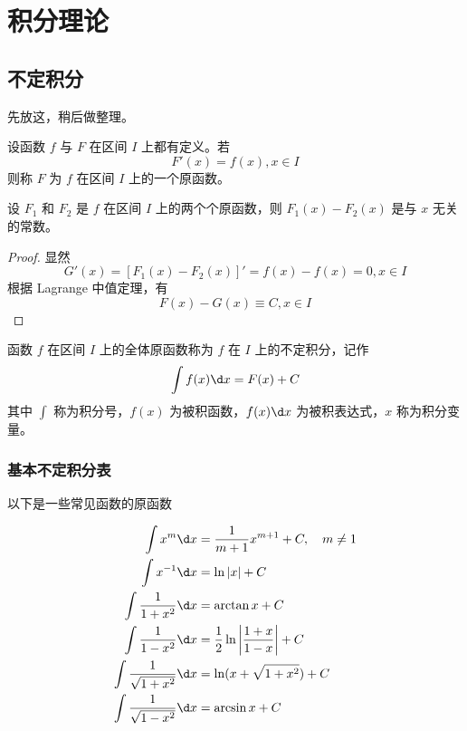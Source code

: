 \chapter{积分理论}

\section{不定积分}

先放这，稍后做整理。

\begin{definition}
	设函数 $f$ 与 $F$ 在区间 $I$ 上都有定义。若
	\[ F'(x) = f(x), x\in I \]
	则称 $F$ 为 $f$ 在区间 $I$ 上的一个原函数。
\end{definition}

\begin{theorem}
	设 $F_1$ 和 $F_2$ 是 $f$ 在区间 $I$ 上的两个个原函数，则 $F_1(x) - F_2(x)$ 是与 $x$ 无关的常数。
\end{theorem}
\begin{proof}
	显然
	\[ G'(x) = \left[ F_1(x)-F_2(x) \right]' = f(x) - f(x) = 0, x \in I \]
	根据 Lagrange 中值定理，有
	\[ F(x) - G(x) \equiv C, x\in I \]
\end{proof}

\begin{definition}
	函数 $f$ 在区间 $I$ 上的全体原函数称为 $f$ 在 $I$ 上的不定积分，记作
	\[ \int f(x) \d x = F(x) + C \]
	其中 $\displaystyle\int$ 称为积分号，$f(x)$ 为被积函数，$f(x)\d x$ 为被积表达式，$x$ 称为积分变量。
\end{definition}

\subsection{基本不定积分表}

以下是一些常见函数的原函数

\[ \begin{aligned}
		\int {x}^{m} \d x                  & = \frac{1}{m + 1} x^{m+1} + C, \quad m \neq 1        \\
		\int x^{-1} \d x                   & = \ln |x| + C                                        \\
		\int \frac{1}{1 + x^2} \d x        & = \arctan x + C                                      \\
		\int \frac{1}{1 - x^2} \d x        & = \frac{1}{2} \ln \left| \frac{1+x}{1-x} \right| + C \\
		\int \frac{1}{\sqrt{1 + x^2}} \d x & = \ln(x+\sqrt{1 + x^2}) + C                          \\
		\int \frac{1}{\sqrt{1 - x^2}} \d x & = \arcsin x + C                                      \\
	\end{aligned} \]

